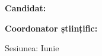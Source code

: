 \begin{titlepage}
\thispagestyle{titlepagestyle}
    \begin{center}
        \vspace*{\fill}
        \textbf{\fontsize{20pt}{30pt} \selectfont \MakeUppercase{\thesisTitle}}
    \end{center}
    
    \vspace*{\fill}
     
            
    \textbf{\fontsize{14pt}{16pt} \selectfont Candidat: \candidateName}
    
    \vspace{14pt}
    
    \textbf{\fontsize{14pt}{16pt} \selectfont Coordonator științific: \coordinator}

    \begin{center}
        \vspace{50pt}
        \fontsize{14pt}{16pt} \selectfont Sesiunea: Iunie \academicYear 
    \end{center}
    

\end{titlepage}